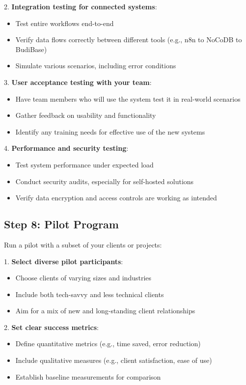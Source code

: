 2. \textbf{Integration testing for connected systems}:
   \begin{itemize}
     \item Test entire workflows end-to-end
     \item Verify data flows correctly between different tools (e.g., n8n to NoCoDB to BudiBase)
     \item Simulate various scenarios, including error conditions
   \end{itemize}

3. \textbf{User acceptance testing with your team}:
   \begin{itemize}
     \item Have team members who will use the system test it in real-world scenarios
     \item Gather feedback on usability and functionality
     \item Identify any training needs for effective use of the new systems
   \end{itemize}

4. \textbf{Performance and security testing}:
   \begin{itemize}
     \item Test system performance under expected load
     \item Conduct security audits, especially for self-hosted solutions
     \item Verify data encryption and access controls are working as intended
   \end{itemize}

\subsection{Step 8: Pilot Program}

Run a pilot with a subset of your clients or projects:

1. \textbf{Select diverse pilot participants}:
   \begin{itemize}
     \item Choose clients of varying sizes and industries
     \item Include both tech-savvy and less technical clients
     \item Aim for a mix of new and long-standing client relationships
   \end{itemize}

2. \textbf{Set clear success metrics}:
   \begin{itemize}
     \item Define quantitative metrics (e.g., time saved, error reduction)
     \item Include qualitative measures (e.g., client satisfaction, ease of use)
     \item Establish baseline measurements for comparison
   \end{itemize}

